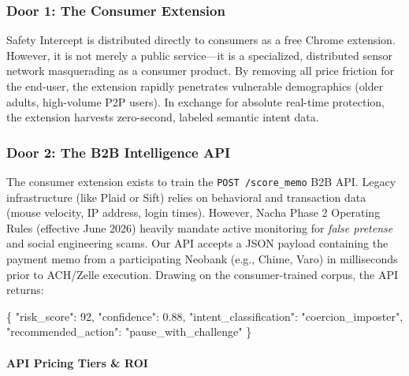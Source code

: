 \documentclass[
]{article}
\newenvironment{Shaded}{}{}
\newcommand{\DataTypeTok}[1]{\textcolor[rgb]{0.56,0.13,0.00}{#1}}
\newcommand{\DecValTok}[1]{\textcolor[rgb]{0.25,0.63,0.44}{#1}}
\newcommand{\FloatTok}[1]{\textcolor[rgb]{0.25,0.63,0.44}{#1}}
\newcommand{\FunctionTok}[1]{\textcolor[rgb]{0.02,0.16,0.49}{#1}}
\newcommand{\StringTok}[1]{\textcolor[rgb]{0.25,0.44,0.63}{#1}}
\begin{document}
\subsubsection{Door 1: The Consumer
Extension}\label{door-1-the-consumer-extension}

Safety Intercept is distributed directly to consumers as a free Chrome
extension. However, it is not merely a public service---it is a
specialized, distributed sensor network masquerading as a consumer
product. By removing all price friction for the end-user, the extension
rapidly penetrates vulnerable demographics (older adults, high-volume
P2P users). In exchange for absolute real-time protection, the extension
harvests zero-second, labeled semantic intent data.

\subsubsection{Door 2: The B2B Intelligence
API}\label{door-2-the-b2b-intelligence-api}

The consumer extension exists to train the \texttt{POST\ /score\_memo}
B2B API. Legacy infrastructure (like Plaid or Sift) relies on behavioral
and transaction data (mouse velocity, IP address, login times). However,
Nacha Phase 2 Operating Rules (effective June 2026) heavily mandate
active monitoring for \emph{false pretense} and social engineering
scams. Our API accepts a JSON payload containing the payment memo from a
participating Neobank (e.g., Chime, Varo) in milliseconds prior to
ACH/Zelle execution. Drawing on the consumer-trained corpus, the API
returns:

\begin{Shaded}
\begin{Highlighting}[]
\FunctionTok{\{}
  \DataTypeTok{"risk\_score"}\FunctionTok{:} \DecValTok{92}\FunctionTok{,}
  \DataTypeTok{"confidence"}\FunctionTok{:} \FloatTok{0.88}\FunctionTok{,}
  \DataTypeTok{"intent\_classification"}\FunctionTok{:} \StringTok{"coercion\_imposter"}\FunctionTok{,}
  \DataTypeTok{"recommended\_action"}\FunctionTok{:} \StringTok{"pause\_with\_challenge"}
\FunctionTok{\}}
\end{Highlighting}
\end{Shaded}

\paragraph{API Pricing Tiers \& ROI}\label{api-pricing-tiers-roi}
\end{document}
